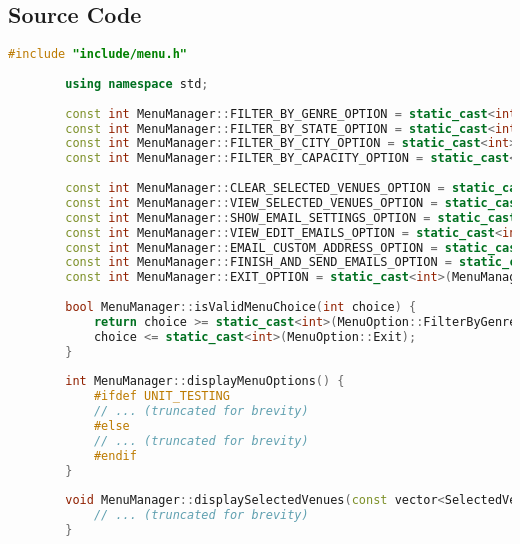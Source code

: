 \documentclass{article}
\begin{document}
	\subsection*{Source Code}
	\begin{mdframed}[backgroundcolor=background, hidealllines=false, innerleftmargin=15pt, innerrightmargin=5pt, innertopmargin=0pt, innerbottommargin=-5pt]
	\begin{lstlisting}[language=C++]
		#include "include/menu.h"
		
		using namespace std;
		
		const int MenuManager::FILTER_BY_GENRE_OPTION = static_cast<int>(MenuManager::MenuOption::FilterByGenre);
		const int MenuManager::FILTER_BY_STATE_OPTION = static_cast<int>(MenuManager::MenuOption::FilterByState);
		const int MenuManager::FILTER_BY_CITY_OPTION = static_cast<int>(MenuManager::MenuOption::FilterByCity);
		const int MenuManager::FILTER_BY_CAPACITY_OPTION = static_cast<int>(MenuManager::MenuOption::FilterByCapacity);
		
		const int MenuManager::CLEAR_SELECTED_VENUES_OPTION = static_cast<int>(MenuManager::MenuOption::ClearSelectedVenues);
		const int MenuManager::VIEW_SELECTED_VENUES_OPTION = static_cast<int>(MenuManager::MenuOption::ViewSelectedVenues);
		const int MenuManager::SHOW_EMAIL_SETTINGS_OPTION = static_cast<int>(MenuManager::MenuOption::ShowEmailSettings);
		const int MenuManager::VIEW_EDIT_EMAILS_OPTION = static_cast<int>(MenuManager::MenuOption::ViewEditEmail);
		const int MenuManager::EMAIL_CUSTOM_ADDRESS_OPTION = static_cast<int>(MenuManager::MenuOption::EmailCustomAddress);
		const int MenuManager::FINISH_AND_SEND_EMAILS_OPTION = static_cast<int>(MenuManager::MenuOption::FinishAndSendEmail);
		const int MenuManager::EXIT_OPTION = static_cast<int>(MenuManager::MenuOption::Exit);
		
		bool MenuManager::isValidMenuChoice(int choice) {
			return choice >= static_cast<int>(MenuOption::FilterByGenre) &&
			choice <= static_cast<int>(MenuOption::Exit);
		}
		
		int MenuManager::displayMenuOptions() {
			#ifdef UNIT_TESTING
			// ... (truncated for brevity)
			#else
			// ... (truncated for brevity)
			#endif
		}
		
		void MenuManager::displaySelectedVenues(const vector<SelectedVenue>& selectedVenues) {
			// ... (truncated for brevity)
		}
	\end{lstlisting}
	\end{mdframed}
\end{document}
